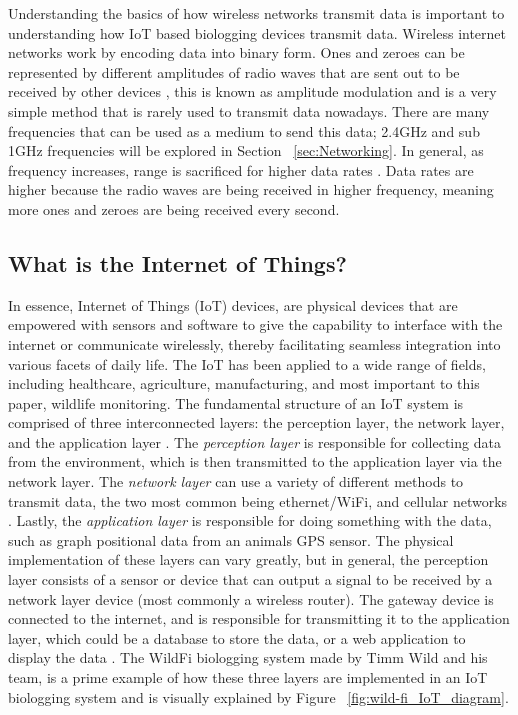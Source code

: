\documentclass[sigplan,screen,nonacm]{acmart}
\begin{document}
Understanding the basics of how wireless networks transmit data is important to understanding 
how IoT based biologging devices transmit data. Wireless internet networks work by encoding data 
into binary form. Ones and zeroes can be represented by different amplitudes of radio waves 
that are sent out to be received by other devices \cite{Ghimire_2023}, this is known as amplitude modulation and is a very simple 
method that is rarely used to transmit data nowadays. There are many frequencies that can 
be used as a medium to send this data; 2.4GHz and sub 1GHz frequencies will be explored in Section ~\ref{sec:Networking}. 
In general, as frequency increases, range is sacrificed for higher data rates \cite{Netgear}. Data rates are 
higher because the radio waves are being received in higher frequency, meaning more ones and zeroes are being received every second.

\subsection{What is the Internet of Things?}
\label{subsec:What is the Internet of Things}

In essence, Internet of Things (IoT) devices, are physical devices
that are empowered with sensors and software to give the capability to
interface with the internet or communicate wirelessly, thereby facilitating
seamless integration into various facets of daily life. The IoT has been
applied to a wide range of fields, including healthcare, agriculture,
manufacturing, and most important to this paper, wildlife monitoring.
The fundamental structure of an IoT system is comprised of three
interconnected layers: the perception layer, the network layer, and the
application layer \cite{kumar2019internet}. The \emph{perception layer} is responsible for collecting data
from the environment, which is then transmitted to the application layer via the network layer.
The \emph{network layer} can use a variety of different methods to transmit data, the two most common being
ethernet/WiFi, and cellular networks \cite{greengard2021internet}. Lastly, the \emph{application
layer} is responsible for doing something with the data, such as graph positional data from an
animals GPS sensor. The physical implementation of these layers
can vary greatly, but in general, the perception layer consists of a sensor or device that can
output a signal to be received by a network layer device (most commonly a wireless router). The gateway device is connected to
the internet, and is responsible for transmitting it to the application layer, which could be a database to store 
the data, or a web application to display the data \cite{kumar2019internet}. 
The WildFi biologging system made by Timm Wild and his team, is a prime example 
of how these three layers are implemented in an IoT biologging system and is visually explained 
by Figure ~\ref{fig:wild-fi_IoT_diagram}.
\end{document}

